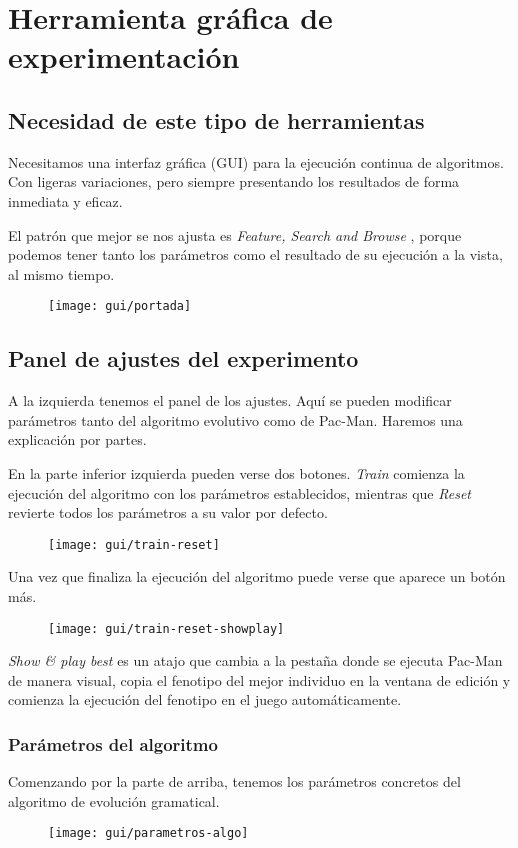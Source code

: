 \chapter{Herramienta gráfica de experimentación} \label{cap:herramienta-grafica}

\section{Necesidad de este tipo de herramientas}
Necesitamos una interfaz gráfica (GUI) para la ejecución continua de algoritmos. Con ligeras variaciones, pero siempre presentando los resultados de forma inmediata y eficaz.

El patrón que mejor se nos ajusta es \textit{Feature, Search and Browse} \cite{tidwell2010designing}, porque podemos tener tanto los parámetros como el resultado de su ejecución a la vista, al mismo tiempo.
\begin{figure}[H]
\centering
\texttt{[image: gui/portada]}
\end{figure}

\section{Panel de ajustes del experimento}
A la izquierda tenemos el panel de los ajustes. Aquí se pueden modificar parámetros tanto del algoritmo evolutivo como de Pac-Man. Haremos una explicación por partes.
 
En la parte inferior izquierda pueden verse dos botones. \textit{Train} comienza la ejecución del algoritmo con los parámetros establecidos, mientras que \textit{Reset} revierte todos los parámetros a su valor por defecto.
\begin{figure}[H]
\centering
\texttt{[image: gui/train-reset]}
\end{figure}

Una vez que finaliza la ejecución del algoritmo puede verse que aparece un botón más.
\begin{figure}[H]
\centering
\texttt{[image: gui/train-reset-showplay]}
\end{figure}

\textit{Show \& play best} es un atajo que cambia a la pestaña donde se ejecuta Pac-Man de manera visual, copia el fenotipo del mejor individuo en la ventana de edición y comienza la ejecución del fenotipo en el juego automáticamente.

\subsection{Parámetros del algoritmo}
Comenzando por la parte de arriba, tenemos los parámetros concretos del algoritmo de evolución gramatical.
\begin{figure}[H]
\centering
\texttt{[image: gui/parametros-algo]}
\end{figure}

